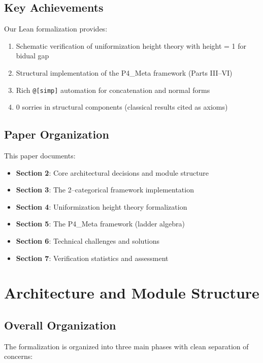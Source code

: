 \documentclass[11pt]{article}
\theoremstyle{definition}
\theoremstyle{remark}
\begin{document}
\subsection{Key Achievements}

Our Lean formalization provides:
\begin{enumerate}
\item Schematic verification of uniformization height theory with height = 1 for bidual gap
\item Structural implementation of the P4\_Meta framework (Parts III--VI)
\item Rich \texttt{@[simp]} automation for concatenation and normal forms
\item 0 sorries in structural components (classical results cited as axioms)
\end{enumerate}

\subsection{Paper Organization}

This paper documents:
\begin{itemize}
\item \textbf{Section 2}: Core architectural decisions and module structure
\item \textbf{Section 3}: The 2--categorical framework implementation
\item \textbf{Section 4}: Uniformization height theory formalization
\item \textbf{Section 5}: The P4\_Meta framework (ladder algebra)
\item \textbf{Section 6}: Technical challenges and solutions
\item \textbf{Section 7}: Verification statistics and assessment
\end{itemize}

\section{Architecture and Module Structure}

\subsection{Overall Organization}

The formalization is organized into three main phases with clean separation of concerns:
\end{document}

